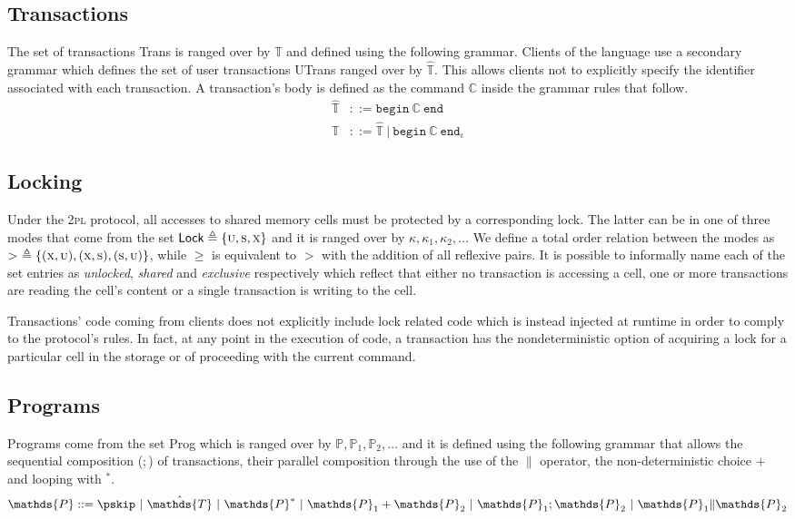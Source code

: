 \subsection{Transactions}

The set of transactions \textsf{Trans} is ranged over by $\mathds{T}$ and defined using the following grammar. Clients of the language use a secondary grammar which defines the set of user transactions \textsf{UTrans} ranged over by $\hat{\mathds{T}}$. This allows clients not to explicitly specify the identifier associated with each transaction. A transaction's body is defined as the command $\mathds{C}$ inside the grammar rules that follow.
\begin{align*}
\hat{\mathds{T}} &::=
\mathtt{begin}\ \mathds{C}\ \mathtt{end} \\
\mathds{T} &::=
\hat{\mathds{T}}\
|\ \mathtt{begin}\ \mathds{C}\ \mathtt{end}_\iota
\end{align*}

\subsection{Locking}

Under the \textsc{2pl} protocol, all accesses to shared memory cells must be protected by a corresponding lock. The latter can be in one of three modes that come from the set $\mathsf{Lock} \triangleq \{ \textsc{u}, \textsc{s}, \textsc{x} \}$ and it is ranged over by $\kappa, \kappa_1, \kappa_2, \ldots$ We define a total order relation between the modes as $>\ \triangleq \{ (\textsc{x}, \textsc{u}), (\textsc{x}, \textsc{s}), (\textsc{s}, \textsc{u}) \}$, while $\geq$ is equivalent to $>$ with the addition of all reflexive pairs. It is possible to informally name each of the set entries as \textit{unlocked}, \textit{shared} and \textit{exclusive} respectively which reflect that either no transaction is accessing a cell, one or more transactions are reading the cell's content or a single transaction is writing to the cell.

Transactions' code coming from clients does not explicitly include lock related code which is instead injected at runtime in order to comply to the protocol's rules. In fact, at any point in the execution of code, a transaction has the nondeterministic option of acquiring a lock for a particular cell in the storage or of proceeding with the current command.

\subsection{Programs}

Programs come from the set \textsf{Prog} which is ranged over by $\mathds{P}, \mathds{P}_1, \mathds{P}_2, \ldots$ and it is defined using the following grammar that allows the sequential composition ($;$) of transactions, their parallel composition through the use of the $\|$ operator, the non-deterministic choice $+$ and looping with $^*$.
\begin{gather*}
\mathds{P} ::=
\pskip\
|\ \hat{\mathds{T}}\
|\ \mathds{P}^*\
|\ \mathds{P}_1 + \mathds{P}_2\
|\ \mathds{P}_1; \mathds{P}_2\
|\ \mathds{P}_1 \| \mathds{P}_2
\end{gather*}
